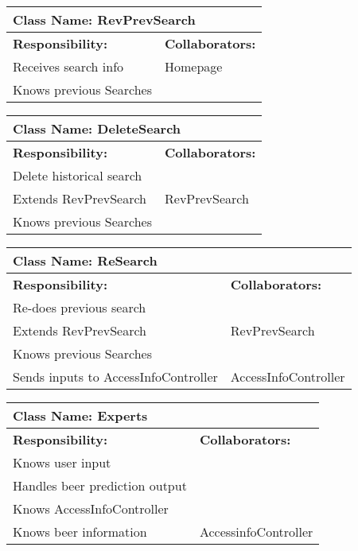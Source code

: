 \documentclass[]{article}
\begin{document}
\begin{table}[ht]
		\centering
		\begin{tabular}{|p{5cm}|p{5cm}|}
			\hline 
			\multicolumn{2}{|l|}{\textbf{Class Name: RevPrevSearch}} \\
			\hline
			\textbf{Responsibility:} & \textbf{Collaborators:} \\
			\hline
			Receives search info & Homepage\\
			\hline
			Knows previous Searches & \\
			\hline
		\end{tabular}
	\end{table}	

\begin{table}[ht]
		\centering
		\begin{tabular}{|p{5cm}|p{5cm}|}
			\hline 
			\multicolumn{2}{|l|}{\textbf{Class Name: DeleteSearch}} \\
			\hline
			\textbf{Responsibility:} & \textbf{Collaborators:} \\
			\hline
			Delete historical search  & \\
			\hline
			Extends RevPrevSearch & RevPrevSearch\\
			\hline
			Knows previous Searches & \\
			\hline
		\end{tabular}
	\end{table}	


	
\begin{table}[ht]
		\centering
		\begin{tabular}{|p{5cm}|p{5cm}|}
			\hline 
			\multicolumn{2}{|l|}{\textbf{Class Name: ReSearch}} \\
			\hline
			\textbf{Responsibility:} & \textbf{Collaborators:} \\
			\hline
			Re-does previous search & \\
			\hline
			Extends RevPrevSearch & RevPrevSearch\\
			\hline
			Knows previous Searches & \\
			\hline
			Sends inputs to AccessInfoController & AccessInfoController\\
			\hline
		\end{tabular}
	\end{table}	

	\begin{table}[ht]
		\centering
		\begin{tabular}{|p{5cm}|p{5cm}|}
		\hline 
		 \multicolumn{2}{|l|}{\textbf{Class Name: Experts}} \\
		\hline
		\textbf{Responsibility:} & \textbf{Collaborators:} \\
		\hline
		Knows user input  & \\
		\hline
		Handles beer prediction output & \\
		\hline
		Knows AccessInfoController & \\
		\hline
		Knows beer information & AccessinfoController\\
		\hline
		
		\end{tabular}
	\end{table}
	
\end{document}
